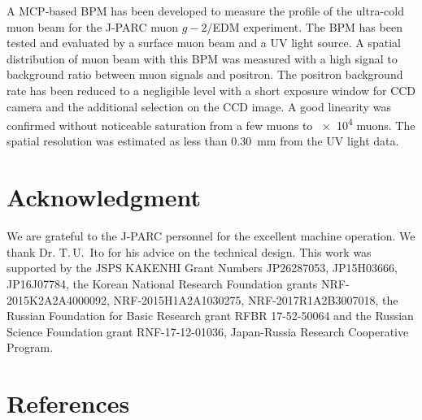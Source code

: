 \documentclass[preprint,3p,twocolumn]{elsarticle}
\begin{document}
A MCP-based BPM has been developed to measure the profile of the
ultra-cold muon beam for the J-PARC muon $g-2$/EDM experiment.
The BPM has been tested and evaluated by a surface muon beam and
a UV light source.  A spatial distribution of muon beam with this
BPM was measured with a high signal to background ratio between
muon signals and positron.  The positron background rate has been
reduced to a negligible level with a short exposure window for
CCD camera and the additional selection on the CCD image.  A good
linearity was confirmed without noticeable saturation from a few
muons to \num{e4} muons.  The spatial resolution was estimated as
less than \SI{.30}{\mm} from the UV light data.

\section*{Acknowledgment}

We are grateful to the J-PARC personnel for the excellent machine
operation.  We thank Dr. T.\,U.~Ito for his advice on the
technical design.  This work was supported by the JSPS KAKENHI
Grant Numbers JP26287053, JP15H03666, JP16J07784, the Korean
National Research Foundation grants NRF-2015K2A2A4000092,
NRF-2015H1A2A1030275, NRF-2017R1A2B3007018, the Russian
Foundation for Basic Research grant RFBR 17-52-50064 and the
Russian Science Foundation grant RNF-17-12-01036, Japan-Russia
Research Cooperative Program.

\section*{References}


\end{document}
